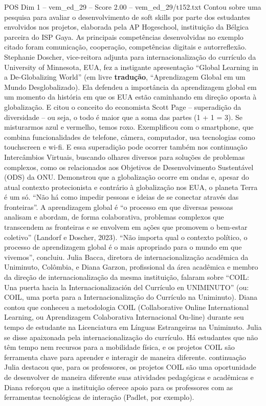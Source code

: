 \begin{textsample}{POS Dim 1 – vem\_ed\_29 – Score 2.00 – vem\_ed\_29/t152.txt}
Contou sobre uma pesquisa para avaliar o desenvolvimento de soft skills por parte dos estudantes envolvidos nos projetos, elaborada pela AP Hogeschool, instituição da Bélgica parceira do ISP Gaya.
As principais competências desenvolvidas no exemplo citado foram comunicação, cooperação, competências digitais e autorreflexão.
Stephanie Doscher, vice-reitora adjunta para internacionalização do currículo da University of Minnesota, EUA, fez a instigante apresentação “Global Learning in a De-Globalizing World” (em livre \textbf{tradução}, “Aprendizagem Global em um Mundo Desglobalizado).
Ela defendeu a importância da aprendizagem global em um momento da história em que os EUA estão caminhando em direção oposta à globalização.
E citou o conceito do economista Scott Page – superadição da diversidade – ou seja, o todo é maior que a soma das partes (1 + 1 = 3).
Se misturarmos azul e vermelho, temos roxo.
Exemplificou com o smartphone, que combina funcionalidades de telefone, câmera, computador, usa tecnologias como touchscreen e wi-fi.
E essa superadição pode ocorrer também nos continuação Intercâmbios Virtuais, buscando olhares diversos para soluções de problemas complexos, como os relacionados aos Objetivos de Desenvolvimento Sustentável (ODS) da ONU.
Demonstrou que a globalização ocorre em ondas e, apesar do atual contexto protecionista e contrário à globalização nos EUA, o planeta Terra é um só. “Não há como impedir pessoas e ideias de se conectar através das fronteiras”.
A aprendizagem global é “o processo em que diversas pessoas analisam e abordam, de forma colaborativa, problemas complexos que transcendem as fronteiras e se envolvem em ações que promovem o bem-estar coletivo” (Landorf e Doscher, 2023). “Não importa qual o contexto político, o processo de aprendizagem global é o mais apropriado para o mundo em que vivemos”, concluiu.
Julia Bacca, diretora de internacionalização acadêmica da Uniminuto, Colômbia, e Diana Garzon, profissional da área acadêmica e membro da direção de internacionalização da mesma instituição, falaram sobre “COIL: Una puerta hacia la Internacionalización del Currículo en UNIMINUTO” (ou: COIL, uma porta para a Internacionalização do Currículo na Uniminuto).
Diana contou que conheceu a metodologia COIL (Collaborative Online International Learning, ou Aprendizagem Colaborativa Internacional On-line) durante seu tempo de estudante na Licenciatura em Línguas Estrangeiras na Uniminuto.
Julia se disse apaixonada pela internacionalização do currículo.
Há estudantes que não têm tempo nem recursos para a mobilidade física, e os projetos COIL são ferramenta chave para aprender e interagir de maneira diferente. continuação Julia destacou que, para os professores, os projetos COIL são uma oportunidade de desenvolver de maneira diferente suas atividades pedagógicas e acadêmicas e Diana reforçou que a instituição oferece apoio para os professores com as ferramentas tecnológicas de interação (Padlet, por exemplo).

\end{textsample}
